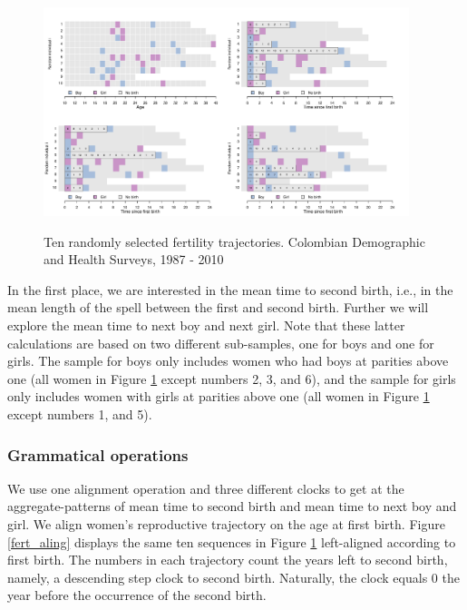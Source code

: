 \documentclass[a4paper,left=1.25cm,right=1.25cm,top=1.25cm,bottom=1.25cm]{article}
\begin{document}
\begin{figure}[H]
\centering
    \includegraphics[trim=0cm 10cm 18cm 1cm, clip, width=0.95\textwidth]{Spells/Figures/colombia/illu_fertility.pdf}\\
    \caption{Ten randomly selected fertility trajectories. Colombian Demographic and Health Surveys, 1987 - 2010}
    \label{fert_illu}
\end{figure}

In the first place, we are interested in the mean time to second birth, i.e., in the mean length of the spell between the first and second birth. Further we will explore the mean time to next boy and next girl. Note that these latter calculations are based on two different sub-samples, one for boys and one for girls. The sample for boys only includes women who had boys at parities above one (all women in Figure \ref{fert_illu} except numbers 2, 3, and 6), and the sample for girls only includes women with girls at parities above one (all women in Figure \ref{fert_illu} except numbers 1, and 5). %


\subsubsection{Grammatical operations}

We use one alignment operation and three different clocks to get at the aggregate-patterns of mean time to second birth and mean time to next boy and girl. We align women's reproductive trajectory on the age at first birth. Figure \ref{fert_aling} displays the same ten sequences in Figure \ref{fert_illu} left-aligned according to first birth. The numbers in each trajectory count the years left to second birth, namely, a descending step clock to second birth. Naturally, the clock equals 0 the year before the occurrence of the second birth.\\
\end{document}
